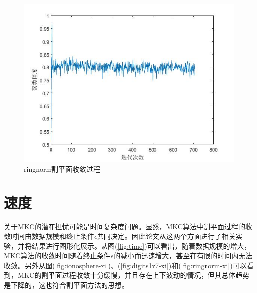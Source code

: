 \begin{figure}[H]
\begin{minipage}[t]{0.45\linewidth}
\includegraphics[width=\textwidth]{figure/ringnorm_acc.jpg}
  \caption{ringnorm割平面收敛过程}
  \label{fig:ringnorm-gpm}
  \end{minipage}
\end{figure}



\section{速度}
关于MKC的潜在担忧可能是时间复杂度问题。显然，MKC算法中割平面过程的收敛时间由数据规模和终止条件$\epsilon$共同决定。因此论文从这两个方面进行了相关实验，并将结果进行图形化展示。从图(\ref{fig:time})可以看出，随着数据规模的增大，MKC算法的收敛时间随着终止条件$\epsilon$的减小而迅速增大，甚至在有限的时间内无法收敛。另外从图(\ref{fig:ionosphere-xi})、(\ref{fig:digits1v7-xi})和(\ref{fig:ringnorm-xi})可以看到，MKC的割平面过程收敛十分缓慢，并且存在上下波动的情况，但其总体趋势是下降的，这也符合割平面方法的思想。

